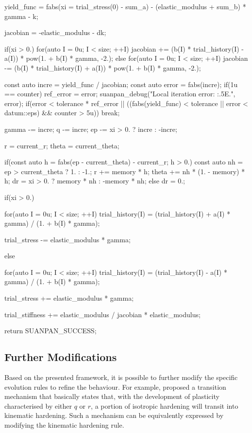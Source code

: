 \begin{cppcode}
{{        yield_func = fabs(xi = trial_stress(0) - sum_a) - (elastic_modulus + sum_b) * gamma - k;

        jacobian = -elastic_modulus - dk;

        if(xi > 0.)
            for(auto I = 0u; I < size; ++I) jacobian += (b(I) * trial_history(I) - a(I)) * pow(1. + b(I) * gamma, -2.);
        else
            for(auto I = 0u; I < size; ++I) jacobian -= (b(I) * trial_history(I) + a(I)) * pow(1. + b(I) * gamma, -2.);

        const auto incre = yield_func / jacobian;
        const auto error = fabs(incre);
        if(1u == counter) ref_error = error;
        suanpan_debug("Local iteration error: {:.5E}.\n", error);
        if(error < tolerance * ref_error || ((fabs(yield_func) < tolerance || error < datum::eps) && counter > 5u)) break;

        gamma -= incre;
        q -= incre;
        ep -= xi > 0. ? incre : -incre;

        r = current_r;
        theta = current_theta;

        if(const auto h = fabs(ep - current_theta) - current_r; h > 0.) {
            const auto nh = ep > current_theta ? 1. : -1.;
            r += memory * h;
            theta += nh * (1. - memory) * h;
            dr = xi > 0. ? memory * nh : -memory * nh;
        }
        else dr = 0.;
    }

    if(xi > 0.) {
        for(auto I = 0u; I < size; ++I) trial_history(I) = (trial_history(I) + a(I) * gamma) / (1. + b(I) * gamma);

        trial_stress -= elastic_modulus * gamma;
    }
    else {
        for(auto I = 0u; I < size; ++I) trial_history(I) = (trial_history(I) - a(I) * gamma) / (1. + b(I) * gamma);

        trial_stress += elastic_modulus * gamma;
    }

    trial_stiffness += elastic_modulus / jacobian * elastic_modulus;

    return SUANPAN_SUCCESS;
}
\end{cppcode}
\subsection{Further Modifications}
Based on the presented framework, it is possible to further modify the specific evolution rules to refine the behaviour.
For example, \cite{Xu2016} proposed a transition mechanism that basically states that, with the development of plasticity characterised by either $q$ or $r$, a portion of isotropic hardening will transit into kinematic hardening.
Such a mechanism can be equivalently expressed by modifying the kinematic hardening rule.

